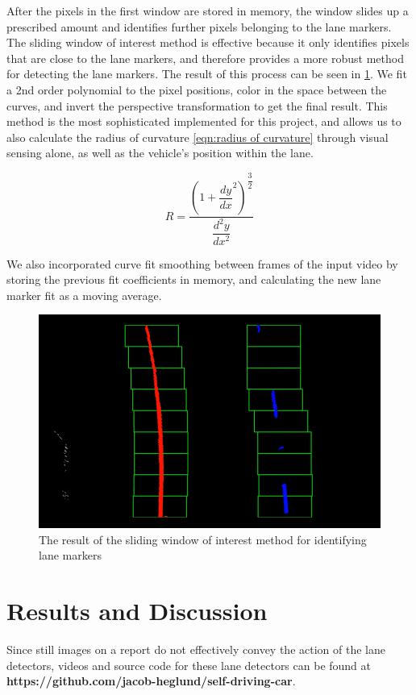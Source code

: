 \documentclass[conf]{new-aiaa}
\begin{document}
After the pixels in the first window are stored in memory, the window slides up a prescribed amount and identifies further pixels belonging to the lane markers.  The sliding window of interest method is effective because it only identifies pixels that are close to the lane markers, and therefore provides a more robust method for detecting the lane markers.  The result of this process can be seen in \ref{fig:adv_sliding_window}.  We fit a 2nd order polynomial to the pixel positions, color in the space between the curves, and invert the perspective transformation to get the final result.  This method is the most sophisticated implemented for this project, and allows us to also calculate the radius of curvature \ref{eqn:radius of curvature} through visual sensing alone, as well as the vehicle's position within the lane.

\begin{equation}
    \label{eqn:radius of curvature}
    R = \dfrac{(1+\dfrac{dy}{dx}^2)^{\dfrac{3}{2}}}{\dfrac{d^2 y}{dx^2}}
\end{equation}

We also incorporated curve fit smoothing between frames of the input video by storing the previous fit coefficients in memory, and calculating the new lane marker fit as a moving average.

\begin{figure}[h!]
    \centering
    \includegraphics[scale = 0.65]{"./images/adv_sliding_window"}
    \caption{The result of the sliding window of interest method for identifying lane markers}
    \label{fig:adv_sliding_window}
\end{figure}

\section{Results and Discussion}
\label{section: results}
Since still images on a report do not effectively convey the action of the lane detectors, videos and source code for these lane detectors can be found at \textbf{https://github.com/jacob-heglund/self-driving-car}.
\end{document}
